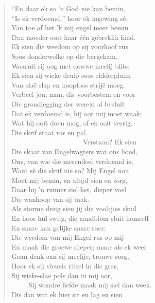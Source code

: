 \begin{verse}
``En daar ek so ’n God nie kan bemin, \\ 
``Is ek verdoemd,'' hoor ek ingewing sê; \\ 
Van toe af het ’k mij engel meer bemin \\ 
Dan moeder ooit haar één gebreklik kind. \\ 
Ek sien die weedom op sij voorhoof rus \\ 
Soos donderwolke op die bergekam, \\ 
Waaruit sij oog met dowwe meelij blits; \\ 
Ek sien sij wieke druip soos ridderpluim \\ 
Van slaë slap en hooploos strijë moeg. \\ 
Verbeel jou, man, dis voorbestem en voor \\ 
Die grondlegging der wereld al besluit \\ 
Dat ek verdoemd is, hij oor mij moet waak; \\ 
Wat hij ooit doen mog, of ek ooit verrig, \\ 
Die skrif staat vas en pal. \\ 
\ \ \ \ \ \ \ \ \ \ \ \ \ \ \ \ \ \ \ \ \ Verstaan? Ek sien \\ 
Die skaar van Engelwagters wat ons hoed, \\ 
Ons, van wie die merendeel verdoemd is, \\ 
Want sê die skrif nie so? Mij Engel nou \\ 
Moet mij bemin, en altijd sien en sorg, \\ 
Daar hij ’n ruimer siel het, dieper voel \\ 
Die wanhoop van sij taak. \\ 
Als storme dreig sien jij die vooltjies skuil \\ 
En hoor hul swijg, die aandblom sluit homself \\ 
En snare kan gelijke snare roer: \\ 
Die weedom van mij Engel rus op mij \\ 
En maak die groewe dieper; maar als ek weer \\ 
Gaan denk aan sij meelije, trouwe sorg, \\ 
Hoor ek sij vleuels ritsel in die gras, \\ 
Sij wieke-slae pols dan in mij oor, \\ 
\ \ \ \ \ Sij wondre liefde maak mij siel dan week. \\ 
Dis dan wat ek hier sit en lag en sien \\ 

\end{verse}
